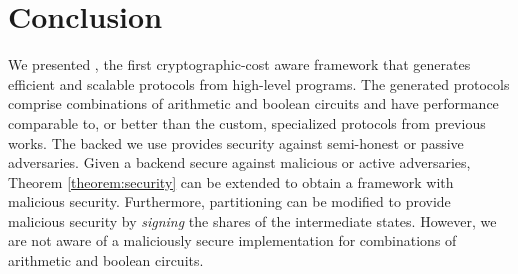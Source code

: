 \section{Conclusion}
\label{sec:conclude}
We presented \tool, the first
cryptographic-cost aware framework that generates efficient and
scalable \mpc protocols from high-level programs.
The generated protocols comprise combinations
of arithmetic and boolean circuits and have performance comparable to, or better than the custom, specialized
protocols from previous works.
The \mpc backed we use provides security against semi-honest or passive adversaries.
Given a \mpc backend secure against malicious or active adversaries, Theorem \ref{theorem:security} 
can be extended to obtain a framework with malicious security. Furthermore,  
partitioning can be modified to provide malicious security by {\it signing} the shares of the intermediate states. However, we are not aware of a maliciously secure \mpc implementation for combinations of
arithmetic and boolean circuits.
